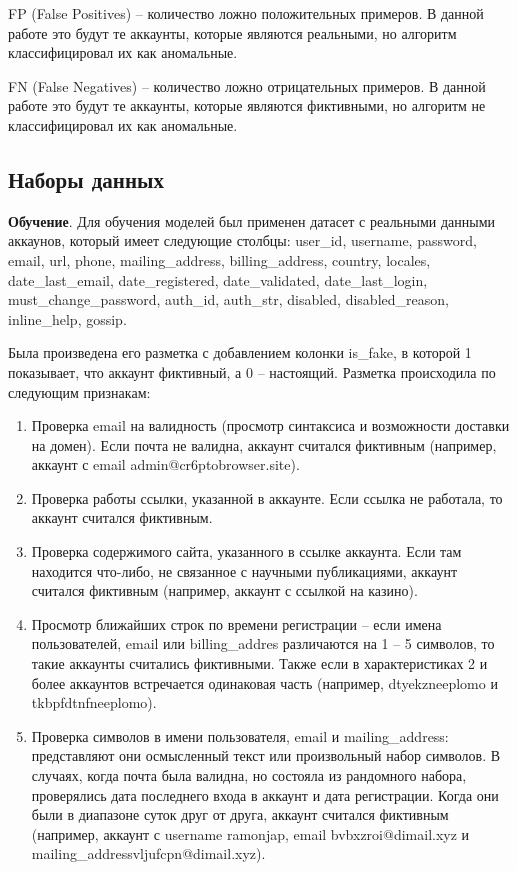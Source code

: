 FP (False Positives) -- количество ложно положительных примеров. В данной работе это будут те аккаунты, которые являются реальными, но алгоритм классифицировал их как аномальные.

FN (False Negatives) -- количество ложно отрицательных примеров. В данной работе это будут те аккаунты, которые являются фиктивными, но алгоритм не классифицировал их как аномальные.

\vspace{1.5em}
\subsection{Наборы данных}
\label{subsec:Dataset}

\textbf{Обучение}. Для обучения моделей был применен датасет с реальными данными аккаунов, который имеет следующие столбцы: user\_id, username, password, email, url, phone, mailing\_address, billing\_address, country, locales, date\_last\_email, date\_registered, date\_validated, date\_last\_login, must\_change\_password, auth\_id, auth\_str, disabled, disabled\_reason, inline\_help, gossip. 

Была произведена его разметка с добавлением колонки is\_fake, в которой 1 показывает, что аккаунт фиктивный, а 0 -- настоящий. 
Разметка происходила по следующим признакам:

\begin{enumerate}[itemindent=2cm, leftmargin=0cm, topsep=0cm, labelsep=0.3cm, itemsep=0cm, parsep=0cm, label=\arabic*., after=\vspace{-0.1cm}, before=\vspace{-0.1cm}]
    \item Проверка email на валидность (просмотр синтаксиса и возможности доставки на домен). Если почта не валидна, аккаунт считался фиктивным (например, аккаунт с email admin@cr6ptobrowser.site).
    \item Проверка работы ссылки, указанной в аккаунте. Если ссылка не работала, то аккаунт считался фиктивным.
    \item Проверка содержимого сайта, указанного в ссылке аккаунта. Если там находится что-либо, не связанное с научными публикациями, аккаунт считался фиктивным (например, аккаунт с ссылкой на казино).
    \item Просмотр ближайших строк по времени регистрации -- если имена пользователей, email или billing\_addres различаются на 1 -- 5 символов, то такие аккаунты считались фиктивными. Также если в характеристиках 2 и более аккаунтов встречается одинаковая часть (например, dtyekzneeplomo и tkbpfdtnfneeplomo).
    \item Проверка символов в имени пользователя, email и mailing\_address: представляют они осмысленный текст или произвольный набор символов. В случаях, когда почта была валидна, но состояла из рандомного набора, проверялись дата последнего входа в аккаунт и дата регистрации. Когда они были в диапазоне суток друг от друга, аккаунт считался фиктивным (например, аккаунт с username ramonjap, email bvbxzroi@dimail.xyz и mailing\_addressvljufcpn@dimail.xyz).
\end{enumerate}

